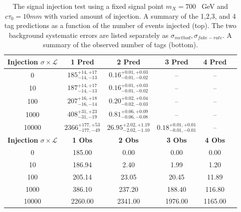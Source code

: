 \begin{table}
\caption{The signal injection test using a fixed signal point $m_{X} = 700$ ~GeV and $c\tau_0 = 10mm$ with varied amount of injection.
 A summary of the 1,2,3, and 4 tag predictions as a function of the number of events injected (top).  The two background systematic errors are
listed separately as $\sigma_{method},\sigma_{fake-rate}$. A summary of the observed number of tags (bottom). 
  \label{tab:700_injection_summary}}
\begin{center}
\begin{tabular}{cccccc}
\hline 
\textbf{Injection} $\sigma\times\mathcal{L}$  & \textbf{1 Pred} & \textbf{2 Pred} & \textbf{3 Pred} &\textbf{4 Pred} \\
\hline
0 &$ 185^{+14,+17}_{-14,-13} $&$0.16^{+0.01,+0.03}_{-0.01,-0.02}$& -- &-- \\
10 &$ 187^{+14,+17}_{-14,-13} $&$0.16^{+0.01,+0.03}_{-0.01,-0.02}$& -- &-- \\
100 &$ 207^{+16,+18}_{-16,-14} $&$0.20^{+0.02,+0.04}_{-0.02,-0.03} $&--&-- \\
1000 &$ 408^{+31,+23}_{-31,-19} $&$0.81^{+0.06,+0.09}_{-0.06,-0.08} $&--&-- \\
10000 &$ 2366^{+177,+53}_{-177,-49} $&$26.95^{+2.02,+1.19}_{-2.02,-1.10} $&$0.18^{+0.01,+0.01}_{-0.01,-0.01} $&-- \\
\hline 
\hline
\textbf{Injection} $\sigma\times\mathcal{L}$ & \textbf{1 Obs} & \textbf{2 Obs} & \textbf{3 Obs} & \textbf{4 Obs}\\
\hline
0 & 185.00 & 0.00 & 0.00 & 0.00 \\
10 & 186.94 & 2.40 & 1.99 & 1.20 \\ 
100 & 205.14 & 23.05 & 20.45 & 11.89 \\
1000 & 386.10 & 237.20 & 188.40 & 116.80 \\
10000 & 2260.00 & 2341.00 & 1976.00 & 1165.00 \\
\hline 
\end{tabular} 
\end{center}
\end{table}

